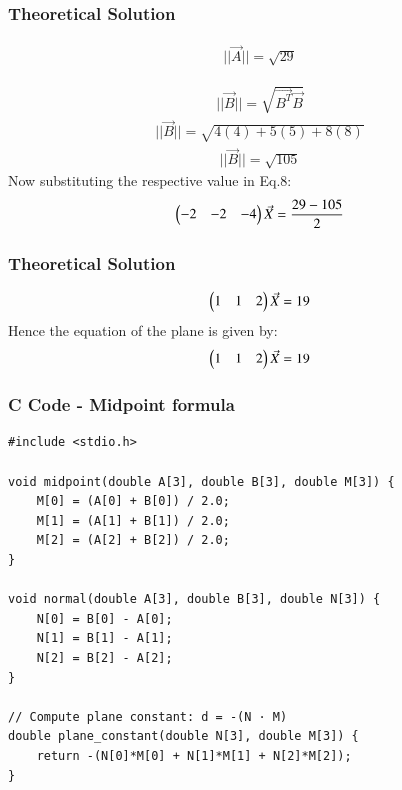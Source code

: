 \documentclass{beamer}
\begin{document}
\begin{frame}
\frametitle{Theoretical Solution}

\begin{align}
    ||\Vec{A}||=\sqrt{29}
\end{align}

\begin{align}
     ||\Vec{B}||=\sqrt{\Vec{B^T}\Vec{B}}
\end{align}
\begin{align}
     ||\Vec{B}||=\sqrt{4(4)+5(5)+8(8)}
\end{align}
\begin{align}
    ||\Vec{B}||=\sqrt{105}
\end{align}
Now substituting the respective value in Eq.8:
\begin{align}
	\begin{pmatrix}-2&-2&-4\end{pmatrix}\Vec{X}=\frac{29-105}{2}
\end{align}



\end{frame}
\begin{frame}
\frametitle{Theoretical Solution}


\begin{align}
	\begin{pmatrix}1&1&2\end{pmatrix}\Vec{X}=19
\end{align}
Hence the equation of the plane is given by:
\begin{align}
	\begin{pmatrix}1&1&2\end{pmatrix}\Vec{X}=19
\end{align}


\end{frame}





\begin{frame}[fragile]
    \frametitle{C Code - Midpoint formula }

    \begin{lstlisting}
#include <stdio.h>

void midpoint(double A[3], double B[3], double M[3]) {
    M[0] = (A[0] + B[0]) / 2.0;
    M[1] = (A[1] + B[1]) / 2.0;
    M[2] = (A[2] + B[2]) / 2.0;
}

void normal(double A[3], double B[3], double N[3]) {
    N[0] = B[0] - A[0];
    N[1] = B[1] - A[1];
    N[2] = B[2] - A[2];
}

// Compute plane constant: d = -(N · M)
double plane_constant(double N[3], double M[3]) {
    return -(N[0]*M[0] + N[1]*M[1] + N[2]*M[2]);
}


    \end{lstlisting}
\end{frame}
\end{document}
